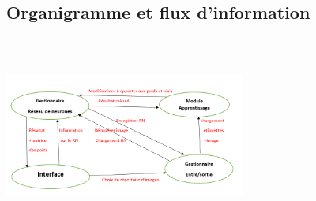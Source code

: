 \documentclass{article}
\begin{document}
	\subsection{Organigramme et flux d'information}
		\begin{center} 
			\includegraphics[height=244, width=300]{pic-min.PNG}
		\end{center}
			
\end{document}
